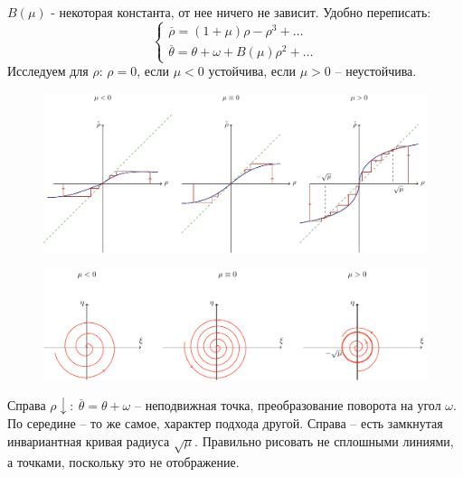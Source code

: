 $B(\mu)$ - некоторая константа, от нее ничего не зависит. Удобно переписать:
\begin{equation}
	\left\{\begin{aligned}
		\stackrel{\_}{\rho}= (1+\mu)\rho-\rho^3+\dots \\
		\stackrel{\_}{\theta}= \theta+\omega+B(\mu)\rho^2+\dots
	\end{aligned}\right.
	\label{eq:s9:5}	
\end{equation}
Исследуем для $\rho$: $\rho=0$, если $\mu<0$ устойчива, если $\mu>0$ -- неустойчива.
\begin{figure}[H]
	\centering
	\includegraphics[width=1\linewidth]{fig/fig73.pdf}   
\end{figure}
\begin{figure}[H]
	\centering
	\includegraphics[width=1\linewidth]{fig/fig72.pdf}   
\end{figure}
Справа $\rho \downarrow: ~\stackrel{\_}{\theta}= \theta+\omega$ -- неподвижная точка, преобразование поворота на угол $\omega$. По середине -- то же самое, характер подхода другой. Справа -- есть замкнутая инвариантная кривая радиуса $\sqrt{\mu}$.
Правильно рисовать не сплошными линиями, а точками, поскольку это не отображение.

